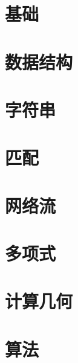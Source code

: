 \documentclass[
    UTF8,
    zihao = 5,
    a4paper,
    twoside,
    openany,
    fontset = fandol,
]{ctexbook}
\begin{document}






\chapter{基础}




\chapter{数据结构}



\chapter{字符串}



\chapter{匹配}





\chapter{网络流}




\chapter{多项式}



\chapter{计算几何}




\chapter{算法}







\end{document}
